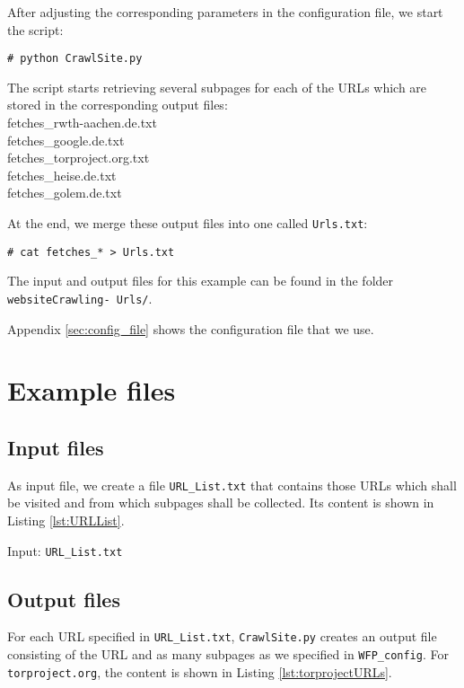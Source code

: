 After adjusting the corresponding parameters in the configuration file, we start the script:
\begin{verbatim}
# python CrawlSite.py
\end{verbatim} 

The script starts retrieving several subpages for each of the \ac{URL}s which are stored in the corresponding output files:\\[1mm]
fetches\_rwth-aachen.de.txt\\
fetches\_google.de.txt\\
fetches\_torproject.org.txt\\
fetches\_heise.de.txt\\
fetches\_golem.de.txt

At the end, we merge these output files into one called \texttt{Urls.txt}:
\begin{verbatim}
# cat fetches_* > Urls.txt
\end{verbatim}

The input and output files for this example can be found in the folder \texttt{websiteCrawling- Urls/}. 


Appendix \ref{sec:config_file} shows the configuration file that we use.

\section{Example files}
%

\subsection{Input files}

As input file, we create a file \texttt{URL\_List.txt} that contains those \ac{URL}s which shall be visited and from which subpages shall be collected. Its content is shown in Listing \ref{lst:URLList}.

\begin{listing}[h!]
\caption{Input: \texttt{URL\_List.txt}}

\label{lst:URLList}
\end{listing}

\subsection{Output files}
For each \ac{URL} specified in \texttt{URL\_List.txt}, \texttt{CrawlSite.py} creates an output file consisting of the \ac{URL} and as many subpages as we specified in \texttt{WFP\_config}. For \texttt{torproject.org}, the content is shown in Listing \ref{lst:torprojectURLs}.

